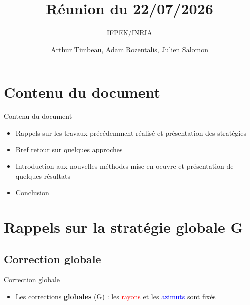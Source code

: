 \documentclass[
11pt,notheorems,hyperref={pdfauthor=whatever}
]{beamer}
\title[
]{Réunion du 22/07/2026}
\subtitle{IFPEN/INRIA}
\author[
]{
    Arthur Timbeau, 
    Adam Rozentalis,
    Julien Salomon
}
\begin{document}

\begin{frame}
  \titlepage
\end{frame}


\begin{frame}
    \tableofcontents
\end{frame}

\section{Contenu du document}

\begin{frame}{Contenu du document}
    \begin{itemize}
        \item Rappels sur les travaux précédemment réalisé et présentation des stratégies 
        \item Bref retour sur quelques approches
        \item Introduction aux nouvelles méthodes mise en oeuvre et présentation de quelques résultats
        \item Conclusion
    \end{itemize}    
\end{frame}




\section{Rappels sur la stratégie globale G}

\subsection{Correction globale}

\begin{frame}{Correction globale}
    \begin{center}
    \begin{itemize}
    \item Les corrections \textbf{globales} (G) : les \textcolor{red}{rayons} et les \textcolor{blue}{azimuts}  sont fixés
    \end{itemize}
\end{center}
\end{frame}
\end{document}
